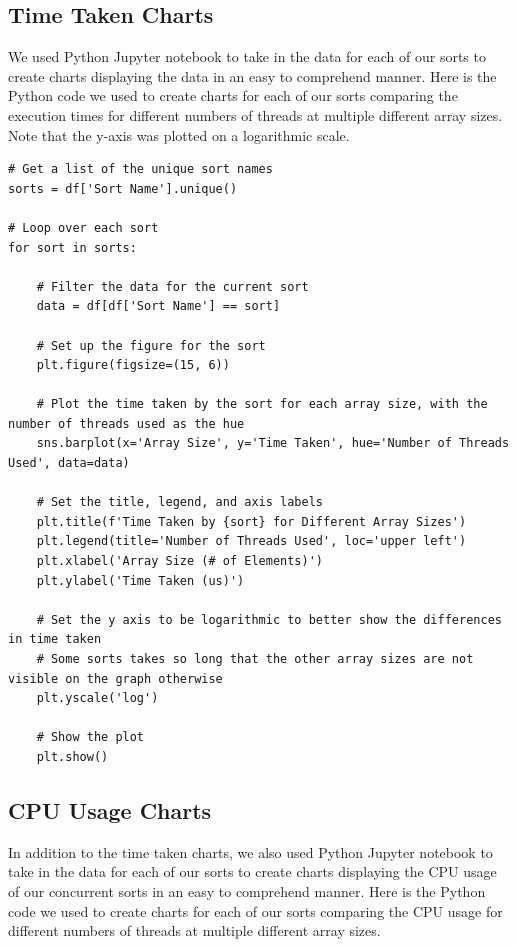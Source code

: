 \documentclass[conference]{IEEEtran}
\begin{document}
\subsection{Time Taken Charts}
We used Python Jupyter notebook to take in the data for each of our sorts to create charts displaying the data in an easy to comprehend manner. Here is the Python code we used to create charts for each of our sorts comparing the execution times for different numbers of threads at multiple different array sizes. Note that the y-axis was plotted on a logarithmic scale.
\lstset{language=python, frame=single, numbers=left, xleftmargin=2em, framexleftmargin=2em, breaklines=true, showstringspaces=false, basicstyle=\scriptsize}
\begin{lstlisting}
# Get a list of the unique sort names
sorts = df['Sort Name'].unique()

# Loop over each sort
for sort in sorts:
    
    # Filter the data for the current sort
    data = df[df['Sort Name'] == sort]

    # Set up the figure for the sort
    plt.figure(figsize=(15, 6))

    # Plot the time taken by the sort for each array size, with the number of threads used as the hue
    sns.barplot(x='Array Size', y='Time Taken', hue='Number of Threads Used', data=data)

    # Set the title, legend, and axis labels
    plt.title(f'Time Taken by {sort} for Different Array Sizes')
    plt.legend(title='Number of Threads Used', loc='upper left')
    plt.xlabel('Array Size (# of Elements)')
    plt.ylabel('Time Taken (us)')
    
    # Set the y axis to be logarithmic to better show the differences in time taken 
    # Some sorts takes so long that the other array sizes are not visible on the graph otherwise
    plt.yscale('log')

    # Show the plot
    plt.show()
\end{lstlisting}

\subsection{CPU Usage Charts}
In addition to the time taken charts, we also used Python Jupyter notebook to take in the data for each of our sorts to create charts displaying the CPU usage of our concurrent sorts in an easy to comprehend manner. Here is the Python code we used to create charts for each of our sorts comparing the CPU usage for different numbers of threads at multiple different array sizes. 
\end{document}
